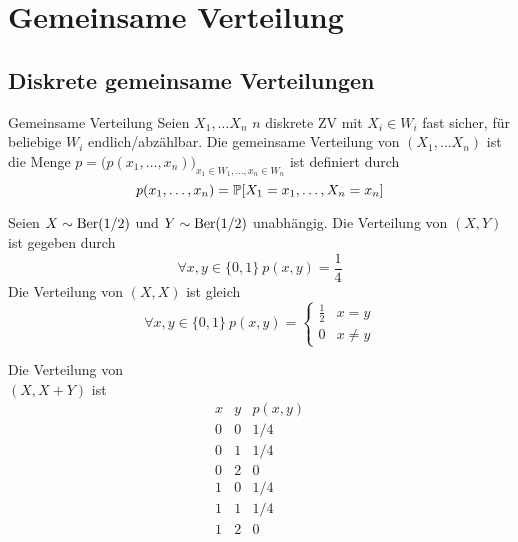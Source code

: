 \section{Gemeinsame Verteilung}%
\label{sec:gemeinsame_verteilung}

\subsection{Diskrete gemeinsame Verteilungen}%
\label{sub:diskrete_gemeinsame_verteilungen}

\begin{definition}{Gemeinsame Verteilung}
	Seien $X_1 , \ldots X_n$ $n$ diskrete ZV mit $X_i \in W_i$ fast sicher, für beliebige $W_i$ endlich/abzählbar. Die
	gemeinsame Verteilung von $(X_1 , \ldots X_n)$ ist die Menge $p = \big( p(x_1 , \ldots , x_n)\big)_{x_1 \in W_1 ,
	\ldots , x_n \in W_n}$ ist definiert durch
	\begin{equation*}
		p (x_1 , \ldots , x_n) = \mathbb{P} [X_1 = x_1 , \ldots , X_n = x_n]
	\end{equation*}
\end{definition}
\begin{center}
	\begin{minipage}{0.6\linewidth}
		Seien $X \sim \text{Ber} (1/2)$ und $Y \sim \text{Ber} (1/2)$ unabhängig.
		Die Verteilung von $(X,Y)$ ist gegeben durch 
		\begin{equation*}
			\forall x,y \in \{0,1\} ~ p(x,y) = \frac{1}{4} 
		\end{equation*}
		Die Verteilung von $(X,X)$ ist gleich
		\begin{equation*}
			\forall x,y \in \{0,1\} ~ p(x,y) = 
			\begin{cases}
				\frac{1}{2} & x = y\\
				0 & x \neq y
			\end{cases}
		\end{equation*}
	\end{minipage}
	\hfill\vline\hfill
	\begin{minipage}{0.35\linewidth}
		Die Verteilung von \\
		$(X, X + Y)$ ist
		\begin{equation*}
			\begin{array}{c|c|c}
				x & y & p(x,y)\\
				\hline
				0 & 0 & 1/4\\
				0 & 1 & 1/4\\
				0 & 2 & 0\\
				1 & 0 & 1/4\\
				1 & 1 & 1/4\\
				1 & 2 & 0
			\end{array}
		\end{equation*}
	\end{minipage}
\end{center}
